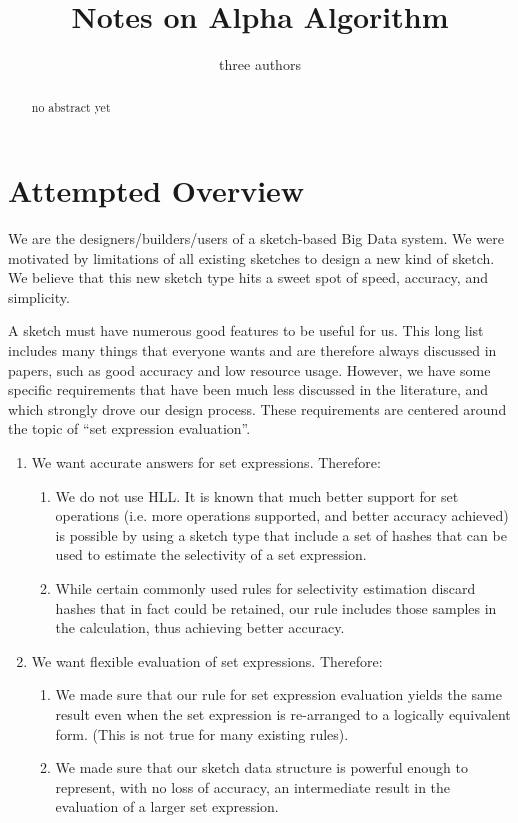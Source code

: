 \documentclass{sig-alternate}
\newenvironment{tighterenumerate}%
  {\begin{enumerate}%
    \setlength{\itemsep}{1pt}%
    \setlength{\parskip}{1pt}}%
  {\end{enumerate}}
\begin{document}

\title{Notes on Alpha Algorithm}

\author{three authors}

\maketitle
\begin{abstract}
no abstract yet
\end{abstract}

\section{Attempted Overview}

We are the designers/builders/users of a sketch-based Big Data system.
We were motivated by limitations of all existing sketches to design a new
kind of sketch. We believe that this new sketch type hits a sweet spot of speed, accuracy,
and simplicity.

A sketch must have numerous good features to be useful for us.
This long list includes many things that everyone wants and are therefore
always discussed in papers, such as good accuracy and low resource usage.
However, we have some specific requirements that have been much less
discussed in the literature, and which strongly drove our design
process. These requirements are centered around the topic of ``set
expression evaluation''.

\begin{tighterenumerate}
\item We want accurate answers for set expressions. Therefore:
\begin{tighterenumerate}
\item We do not use HLL. 
It is known that much better support for set operations
(i.e. more operations supported, and better accuracy achieved) is possible
by using a sketch type that include a set of hashes
that can be used to estimate the selectivity of a set expression.
\item While certain commonly used rules for selectivity estimation
discard hashes that in fact could be retained, our rule includes 
those samples in the calculation, thus achieving better accuracy.
\end{tighterenumerate}
\item We want flexible evaluation of set expressions. Therefore:
\begin{tighterenumerate}
\item We made sure that our rule for set expression evaluation yields
the same result even when the set expression is re-arranged to
a logically equivalent form. (This is not true for many existing rules).
\item We made sure that our sketch data structure is powerful enough
to represent, with no loss of accuracy, an intermediate result in the
evaluation of a larger set expression.
\end{tighterenumerate}
\end{tighterenumerate}
\end{document}
